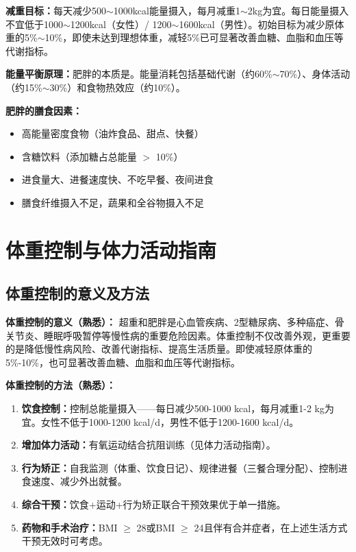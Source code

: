 \begin{keybox}
\textbf{减重目标：}每天减少500$\sim$1000kcal能量摄入，每月减重1$\sim$2kg为宜。每日能量摄入不宜低于1000$\sim$1200kcal（女性）/ 1200$\sim$1600kcal（男性）。初始目标为减少原体重的5\%$\sim$10\%，即使未达到理想体重，减轻5\%已可显著改善血糖、血脂和血压等代谢指标。

\textbf{能量平衡原理：}肥胖的本质是。能量消耗包括基础代谢（约60\%$\sim$70\%）、身体活动（约15\%$\sim$30\%）和食物热效应（约10\%）。

\textbf{肥胖的膳食因素：}
\begin{itemize}[leftmargin=*]
    \item 高能量密度食物（油炸食品、甜点、快餐）
    \item 含糖饮料（添加糖占总能量 $>$ 10\%）
    \item 进食量大、进餐速度快、不吃早餐、夜间进食
    \item 膳食纤维摄入不足，蔬果和全谷物摄入不足
\end{itemize}
\end{keybox}

\section{体重控制与体力活动指南}

\subsection{体重控制的意义及方法}

\begin{tipbox}
\textbf{体重控制的意义（熟悉）：}
超重和肥胖是心血管疾病、2型糖尿病、多种癌症、骨关节炎、睡眠呼吸暂停等慢性病的重要危险因素。体重控制不仅改善外观，更重要的是降低慢性病风险、改善代谢指标、提高生活质量。即使减轻原体重的5\%-10\%，也可显著改善血糖、血脂和血压等代谢指标。

\textbf{体重控制的方法（熟悉）：}
\begin{enumerate}[leftmargin=*]
    \item \textbf{饮食控制：}控制总能量摄入——每日减少500-1000 kcal，每月减重1-2 kg为宜。女性不低于1000-1200 kcal/d，男性不低于1200-1600 kcal/d。
    \item \textbf{增加体力活动：}有氧运动结合抗阻训练（见体力活动指南）。
    \item \textbf{行为矫正：}自我监测（体重、饮食日记）、规律进餐（三餐合理分配）、控制进食速度、减少外出就餐。
    \item \textbf{综合干预：}饮食+运动+行为矫正联合干预效果优于单一措施。
    \item \textbf{药物和手术治疗：}BMI $\ge$ 28或BMI $\ge$ 24且伴有合并症者，在上述生活方式干预无效时可考虑。
\end{enumerate}
\end{tipbox}

